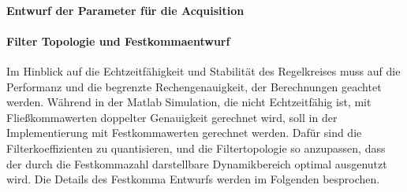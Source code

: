 \paragraph{Entwurf der Parameter für die Acquisition}



\paragraph{Filter Topologie und Festkommaentwurf}
Im Hinblick auf die Echtzeitfähigkeit und Stabilität des Regelkreises muss auf die Performanz und die begrenzte Rechengenauigkeit, der Berechnungen geachtet werden. Während in der Matlab Simulation, die nicht Echtzeitfähig ist, mit Fließkommawerten doppelter Genauigkeit gerechnet wird, soll in der Implementierung mit Festkommawerten gerechnet werden.
Dafür sind die Filterkoeffizienten zu quantisieren, und die Filtertopologie so anzupassen, dass der durch die Festkommazahl darstellbare Dynamikbereich optimal ausgenutzt wird. Die Details des Festkomma Entwurfs werden im Folgenden besprochen.

